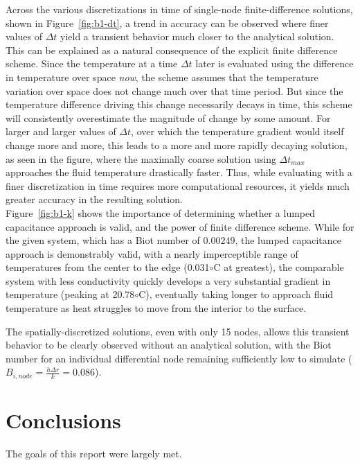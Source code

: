 \documentclass[12pt]{article}
\begin{document}
Across the various discretizations in time of single-node finite-difference solutions, shown in Figure~\ref{fig:b1-dt}, a trend in accuracy can be observed where finer values of $\Delta t$ yield a transient behavior much closer to the analytical solution.
This can be explained as a natural consequence of the explicit finite difference scheme.
Since the temperature at a time $\Delta t$ later is evaluated using the difference in temperature over space \emph{now}, the scheme assumes that the temperature variation over space does not change much over that time period.
But since the temperature difference driving this change necessarily decays in time, this scheme will consistently overestimate the magnitude of change by some amount.
For larger and larger values of $\Delta t$, over which the temperature gradient would itself change more and more, this leads to a more and more rapidly decaying solution, as seen in the figure, where the maximally coarse solution using $\Delta t_{max}$ approaches the fluid temperature drastically faster.
Thus, while evaluating with a finer discretization in time requires more computational resources, it yields much greater accuracy in the resulting solution.\\

Figure~\ref{fig:b1-k} shows the importance of determining whether a lumped capacitance approach is valid, and the power of finite difference scheme.
While for the given system, which has a Biot number of $0.00249$, the lumped capacitance approach is demonstrably valid, with a nearly imperceptible range of temperatures from the center to the edge (0.031$\circ$C at greatest), the comparable system with less conductivity quickly develops a very substantial gradient in temperature (peaking at 20.78$\circ$C), eventually taking longer to approach fluid temperature as heat struggles to move from the interior to the surface.

The spatially-discretized solutions, even with only 15 nodes, allows this transient behavior to be clearly observed without an analytical solution, with the Biot number for an individual differential node remaining sufficiently low to simulate ($B_{i, node}=\frac{h\Delta r}{k}=0.086$).


\section{Conclusions}\label{sec:conc}
The goals of this report were largely met.\\
\end{document}
